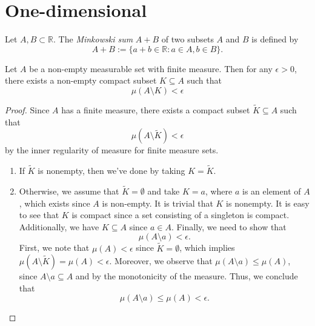 \section{One-dimensional}

\begin{definition}
    Let \(A, B \subset \mathbb{R}\). The \textit{Minkowski sum} \(A+B\) of two subsets \(A\) and \(B\) is defined by
    \begin{equation*}
        A+B:= \{a+b\in\mathbb{R} : a \in A, b \in B\}.
    \end{equation*}
\end{definition}

\begin{lemma}
    Let \(A\) be a non-empty measurable set with finite measure. 
    Then for any \(\epsilon > 0\), there exists a non-empty compact subset \(K \subseteq A\) such that 
    \begin{equation*}
        \mu(A \setminus K) < \epsilon
    \end{equation*}
\end{lemma}

\begin{proof}
    Since \(A\) has a finite measure, there exists a compact subset \(\widetilde{K} \subseteq A\) such that 
    \begin{equation*}
        \mu (A \setminus \widetilde{K}) < \epsilon
    \end{equation*}
    by the inner regularity of measure for finite measure sets.
    \begin{enumerate}
        \item If \(\widetilde{K}\) is nonempty, then we've done by taking \(K = \widetilde{K}\).
        \item Otherwise, we assume that \(\widetilde{K} = \emptyset\) and take \(K = {a}\), where \(a\) is an element of \(A\), which exists since \(A\) is non-empty. 
        It is trivial that \(K\) is nonempty. It is easy to see that \(K\) is compact since a set consisting of a singleton is compact.
        Additionally, we have \(K \subseteq A\) since \(a \in A\). Finally, we need to show that 
        \begin{equation*}
            \mu(A \setminus {a}) < \epsilon.
        \end{equation*}
        First, we note that \(\mu(A)<\epsilon\) since \(\widetilde{K} = \emptyset\), which implies \(\mu(A\setminus \widetilde{K}) = \mu(A) < \epsilon\).
        Moreover, we observe that \(\mu(A \setminus {a}) \leq \mu(A)\), since \(A\setminus {a} \subseteq A\) and by the monotonicity of the measure. 
        Thus, we conclude that
        \begin{equation*}
            \mu (A \setminus {a}) \leq \mu(A) < \epsilon.
        \end{equation*}
    \end{enumerate}
\end{proof}

